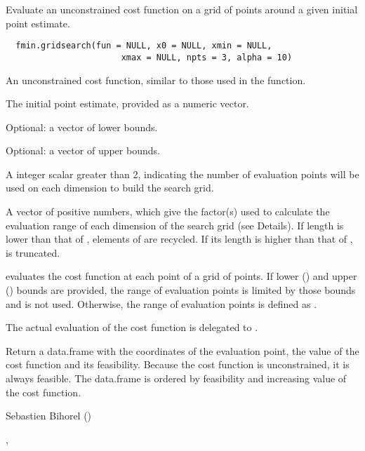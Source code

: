 %
\begin{Description}\relax
Evaluate an unconstrained cost function on a grid of points around a given 
initial point estimate.
\end{Description}
%
\begin{Usage}
\begin{verbatim}
  fmin.gridsearch(fun = NULL, x0 = NULL, xmin = NULL, 
                       xmax = NULL, npts = 3, alpha = 10)
\end{verbatim}
\end{Usage}
%
\begin{Arguments}
\begin{ldescription}
\item[\code{fun}] An unconstrained cost function, similar to those used in the 
 function.
\item[\code{x0}] The initial point estimate, provided as a numeric vector.
\item[\code{xmin}] Optional: a vector of lower bounds.
\item[\code{xmax}] Optional: a vector of upper bounds.
\item[\code{npts}] A integer scalar greater than 2, indicating the number of 
evaluation points will be used on each dimension to build the search grid.
\item[\code{alpha}] A vector of positive numbers, which give the factor(s) used to 
calculate the evaluation range of each dimension of the search grid (see 
Details). If  length is lower than that of , elements 
of  are recycled. If its length is higher than that of 
,  is truncated.
\end{ldescription}
\end{Arguments}
%
\begin{Details}\relax
{} evaluates the cost function at each point 
of a grid of  points. If lower () and upper 
() bounds are provided, the range of evaluation points is limited 
by those bounds and  is not used. Otherwise, the range of 
evaluation points is defined as .

The actual evaluation of the cost function is delegated to 
.
\end{Details}
%
\begin{Value}
Return a data.frame with the coordinates of the evaluation point, the value of
the cost function and its feasibility. Because the cost function is 
unconstrained, it is always feasible. The data.frame is ordered by feasibility
and increasing value of the cost function.
\end{Value}
%
\begin{Author}\relax
Sebastien Bihorel ()
\end{Author}
%
\begin{SeeAlso}\relax
{}, 
\end{SeeAlso}
